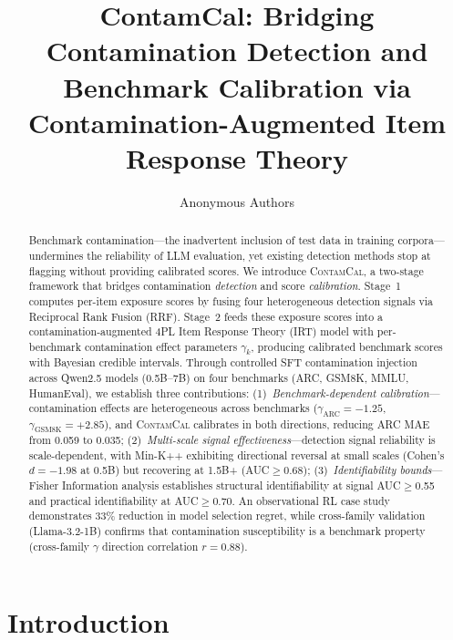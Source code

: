 \documentclass[11pt,a4paper]{article}
\title{ContamCal: Bridging Contamination Detection and Benchmark Calibration via Contamination-Augmented Item Response Theory}
\author{
  Anonymous Authors
}
\date{}
\newcommand{\contamcal}{\textsc{ContamCal}}
\begin{document}
\maketitle

\begin{abstract}
Benchmark contamination---the inadvertent inclusion of test data in training corpora---undermines the reliability of LLM evaluation, yet existing detection methods stop at flagging without providing calibrated scores. We introduce \contamcal{}, a two-stage framework that bridges contamination \emph{detection} and score \emph{calibration}. Stage~1 computes per-item exposure scores by fusing four heterogeneous detection signals via Reciprocal Rank Fusion (RRF). Stage~2 feeds these exposure scores into a contamination-augmented 4PL Item Response Theory (IRT) model with per-benchmark contamination effect parameters $\gamma_k$, producing calibrated benchmark scores with Bayesian credible intervals. Through controlled SFT contamination injection across Qwen2.5 models (0.5B--7B) on four benchmarks (ARC, GSM8K, MMLU, HumanEval), we establish three contributions: (1)~\emph{Benchmark-dependent calibration}---contamination effects are heterogeneous across benchmarks ($\gamma_{\text{ARC}}=-1.25$, $\gamma_{\text{GSM8K}}=+2.85$), and \contamcal{} calibrates in both directions, reducing ARC MAE from 0.059 to 0.035; (2)~\emph{Multi-scale signal effectiveness}---detection signal reliability is scale-dependent, with Min-K++ exhibiting directional reversal at small scales (Cohen's $d=-1.98$ at 0.5B) but recovering at 1.5B+ (AUC$\geq$0.68); (3)~\emph{Identifiability bounds}---Fisher Information analysis establishes structural identifiability at signal AUC$\geq$0.55 and practical identifiability at AUC$\geq$0.70. An observational RL case study demonstrates 33\% reduction in model selection regret, while cross-family validation (Llama-3.2-1B) confirms that contamination susceptibility is a benchmark property (cross-family $\gamma$ direction correlation $r=0.88$).
\end{abstract}

\section{Introduction}
\label{sec:intro}
\end{document}
